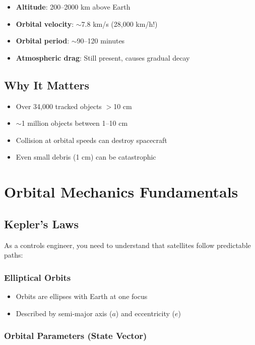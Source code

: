 \documentclass[11pt,a4paper]{article}
\begin{document}
\begin{itemize}[leftmargin=*]
    \item \textbf{Altitude}: 200--2000 km above Earth
    \item \textbf{Orbital velocity}: $\sim$7.8 km/s (28,000 km/h!)
    \item \textbf{Orbital period}: $\sim$90--120 minutes
    \item \textbf{Atmospheric drag}: Still present, causes gradual decay
\end{itemize}

\subsection{Why It Matters}

\begin{itemize}[leftmargin=*]
    \item Over 34,000 tracked objects $>$10 cm
    \item $\sim$1 million objects between 1--10 cm
    \item Collision at orbital speeds can destroy spacecraft
    \item Even small debris (1 cm) can be catastrophic
\end{itemize}

\section{Orbital Mechanics Fundamentals}

\subsection{Kepler's Laws}

As a controls engineer, you need to understand that satellites follow predictable paths:

\subsubsection{Elliptical Orbits}
\begin{itemize}[leftmargin=*]
    \item Orbits are ellipses with Earth at one focus
    \item Described by semi-major axis ($a$) and eccentricity ($e$)
\end{itemize}

\subsubsection{Orbital Parameters (State Vector)}
\end{document}
